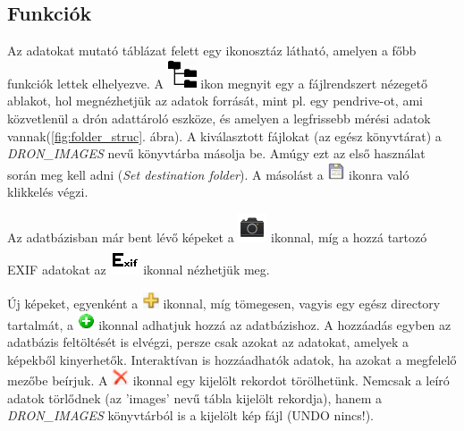 \documentclass[a4paper,12pt]{article}
\begin{document}
\subsection{Funkciók}

Az adatokat mutató táblázat felett egy ikonosztáz látható, amelyen a főbb funkciók lettek elhelyezve. A \includegraphics[width = 0.5 cm]{filesystem.png} ikon megnyit egy a fájlrendszert nézegető ablakot, hol megnézhetjük az adatok forrását, mint pl. egy pendrive-ot, ami közvetlenül a drón adattároló eszköze, és amelyen a legfrissebb mérési adatok vannak(\ref{fig:folder_struc}. ábra). A kiválasztott fájlokat (az egész könyvtárat) a \textit{DRON\_IMAGES} nevű könyvtárba másolja be. Amúgy ezt az első használat során meg kell adni (\textit{Set destination folder}). A másolást a \includegraphics[width=0.5cm]{save.png} ikonra való klikkelés végzi.

Az adatbázisban már bent lévő képeket a \includegraphics[width = 0.5 cm]{camera.png}  ikonnal, míg a hozzá tartozó EXIF adatokat az \includegraphics[width = 0.5 cm]{exif.png}  ikonnal nézhetjük meg.

Új képeket, egyenként a \includegraphics[width=0.5cm]{plus.png} ikonnal, míg tömegesen, vagyis egy egész directory tartalmát, a \includegraphics[width=0.5cm]{addfolder.png} ikonnal adhatjuk hozzá az adatbázishoz. A hozzáadás egyben az adatbázis feltöltését is elvégzi, persze csak azokat az adatokat, amelyek a képekből kinyerhetők. Interaktívan is hozzáadhatók adatok, ha azokat a megfelelő mezőbe beírjuk. A \includegraphics[width=0.5cm]{del.png} ikonnal egy kijelölt rekordot törölhetünk. Nemcsak a leíró adatok törlődnek (az 'images' nevű tábla kijelölt rekordja), hanem a \textit{DRON\_IMAGES} könyvtárból is a kijelölt kép fájl (UNDO nincs!).
\end{document}
